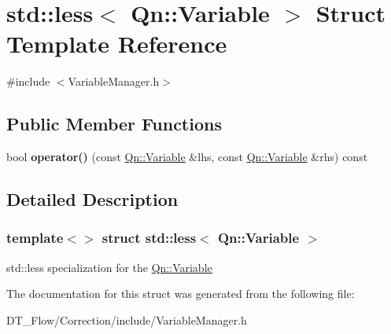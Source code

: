 \hypertarget{structstd_1_1less_3_01Qn_1_1Variable_01_4}{}\section{std\+:\+:less$<$ Qn\+:\+:Variable $>$ Struct Template Reference}
\label{structstd_1_1less_3_01Qn_1_1Variable_01_4}


{\ttfamily \#include $<$Variable\+Manager.\+h$>$}

\subsection*{Public Member Functions}
\begin{DoxyCompactItemize}
\item 
\mbox{\label{structstd_1_1less_3_01Qn_1_1Variable_01_4_ad63cb583e698381109e45a5dfdf12d3b}} 
bool {\bfseries operator()} (const \mbox{\hyperlink{classQn_1_1Variable}{Qn\+::\+Variable}} \&lhs, const \mbox{\hyperlink{classQn_1_1Variable}{Qn\+::\+Variable}} \&rhs) const
\end{DoxyCompactItemize}


\subsection{Detailed Description}
\subsubsection*{template$<$$>$\newline
struct std\+::less$<$ Qn\+::\+Variable $>$}

std\+::less specialization for the \mbox{\hyperlink{classQn_1_1Variable}{Qn\+::\+Variable}} 

The documentation for this struct was generated from the following file\+:\begin{DoxyCompactItemize}
\item 
D\+T\+\_\+\+Flow/\+Correction/include/Variable\+Manager.\+h\end{DoxyCompactItemize}
